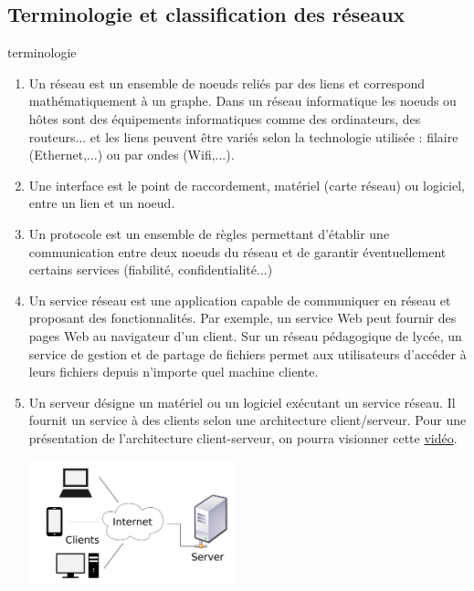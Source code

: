 \documentclass[a4paper,dvipsnames]{article}
\begin{document}
\subsection{Terminologie et classification des réseaux}

\begin{definition}[breakable]{terminologie}{}
 \begin{enumerate}
   \item Un {\color{red}réseau} est un ensemble de noeuds reliés par des liens et correspond mathématiquement à un graphe. Dans un {\color{red}réseau informatique} les noeuds ou hôtes sont des équipements informatiques comme des ordinateurs, des routeurs... et les liens peuvent être variés selon la technologie utilisée : filaire (Ethernet,...) ou par ondes (Wifi,...).
   \item Une {\color{red}interface} est le point de raccordement, matériel (carte réseau) ou logiciel, entre un lien et un noeud.
   \item Un {\color{red}protocole} est un ensemble de règles permettant d'établir une communication entre deux noeuds du réseau et de garantir éventuellement certains services (fiabilité, confidentialité...)
   \item Un {\color{red}service réseau} est une application capable de communiquer en réseau et proposant des fonctionnalités. Par exemple, un service Web peut fournir des pages Web au navigateur d'un client. Sur un réseau pédagogique de lycée, un service de gestion et de partage de fichiers permet aux utilisateurs d'accéder à leurs fichiers depuis n'importe quel machine cliente.
   \item Un {\color{red}serveur} désigne un matériel ou un logiciel exécutant un {\color{red}service réseau}. Il fournit un service à des {\color{red}clients} selon une {\color{red}architecture client/serveur}. Pour une présentation de l'architecture client-serveur, on pourra visionner cette \href{https://vimeo.com/138623558}{vidéo}.

     \begin{center}
       \includegraphics[width=6cm]{img/architecture_client-serveur.png}
     \end{center}
 \end{enumerate}
\end{definition}
\end{document}
